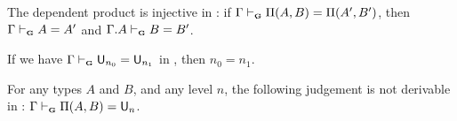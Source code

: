 \begin{theorem}\label{Pi-inj}
    The dependent product is injective in \ThyGAT: if $\Gamma \vdashG \Pi(A,B) = \Pi(A',B')$, then $\Gamma \vdashG A = A'$ and $\Gamma.A \vdashG B = B'$.
\end{theorem}

\begin{theorem}\label{univ-inj}
    If we have $\Gamma \vdashG \U_{n_0} = \U_{n_1}$ in \ThyGAT, then $n_0 = n_1$. 
\end{theorem}

\begin{theorem}\label{no-confusion}
    For any types $A$ and $B$, and any level $n$, the following judgement is not derivable in \ThyGAT: $\Gamma \vdashG \Pi(A,B) = \U_n$. 
\end{theorem}

